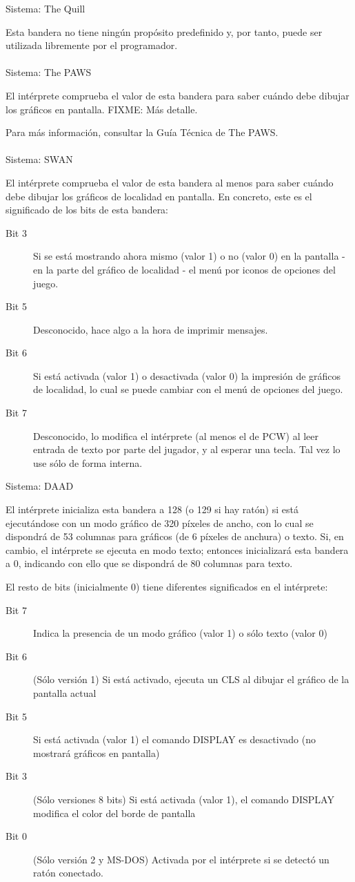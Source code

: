 \documentclass[11pt, a5paper]{article}
\newcommand{\quill}{\textsf{The Quill}\xspace}
\newcommand{\paw}{\textsf{The PAWS}\xspace}
\newcommand{\swan}{\textsf{SWAN}\xspace}
\newcommand{\daad}{\textsf{DAAD}\xspace}
\newcommand{\sistema}[1]{\noindent Sistema: #1 \nopagebreak}
\begin{document}
\sistema{\quill}

Esta bandera no tiene ningún propósito predefinido y, por tanto, puede ser utilizada libremente por el programador.
\\\ \\
\sistema{\paw}

El intérprete comprueba el valor de esta bandera para saber cuándo debe dibujar los gráficos en pantalla. FIXME: Más detalle.

Para más información, consultar la Guía Técnica de \paw \cite{PawsZX}.
\\\ \\
\sistema{\swan}

El intérprete comprueba el valor de esta bandera al menos para saber cuándo debe dibujar los gráficos de localidad en pantalla. En concreto, este es el significado de los bits de esta bandera:

\begin{description}
  \item[Bit 3] Si se está mostrando ahora mismo (valor 1) o no (valor 0) en la pantalla - en la parte del gráfico de localidad - el menú por iconos de opciones del juego.
  \item[Bit 5] Desconocido, hace algo a la hora de imprimir mensajes.
  \item[Bit 6] Si está activada (valor 1) o desactivada (valor 0) la impresión de gráficos de localidad, lo cual se puede cambiar con el menú de opciones del juego.
  \item[Bit 7] Desconocido, lo modifica el intérprete (al menos el de PCW) al leer entrada de texto por parte del jugador, y al esperar una tecla. Tal vez lo use sólo de forma interna.
\end{description}

\sistema{\daad}

El intérprete inicializa esta bandera a 128 (o 129 si hay ratón) si está ejecutándose con un modo gráfico de 320 píxeles de ancho, con lo cual se dispondrá de 53 columnas para gráficos (de 6 píxeles de anchura) o texto. Si, en cambio, el intérprete se ejecuta en modo texto; entonces inicializará esta bandera a 0, indicando con ello que se dispondrá de 80 columnas para texto.

El resto de bits (inicialmente 0) tiene diferentes significados en el intérprete:

\begin{description}
  \item[Bit 7] Indica la presencia de un modo gráfico (valor 1) o sólo texto (valor 0)
  \item[Bit 6] (Sólo versión 1) Si está activado, ejecuta un CLS al dibujar el gráfico de la pantalla actual
  \item[Bit 5] Si está activada (valor 1) el comando DISPLAY es desactivado (no mostrará gráficos en pantalla)
  \item[Bit 3] (Sólo versiones 8 bits) Si está activada (valor 1), el comando DISPLAY modifica el color del borde de pantalla
  \item[Bit 0] (Sólo versión 2 y MS-DOS) Activada por el intérprete si se detectó un ratón conectado.
\end{description}
\end{document}
